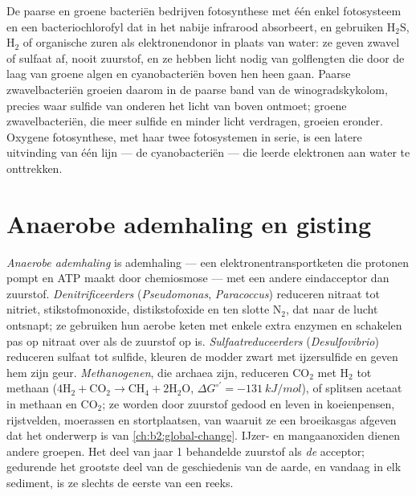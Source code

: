 \begin{definition}\label{def:b2:microbial-metabolism:anoxygenic}
De paarse en groene bacteriën bedrijven fotosynthese met één enkel
fotosysteem en een bacteriochlorofyl dat in het nabije infrarood
absorbeert, en gebruiken $\mathrm{H_2S}$, $\mathrm{H_2}$ of organische
zuren als elektronendonor in plaats van water: ze geven zwavel of
sulfaat af, nooit zuurstof, en ze hebben licht nodig van golflengten
die door de laag van groene algen en cyanobacteriën boven hen heen
gaan. Paarse zwavelbacteriën groeien daarom in de paarse band van de
winogradskykolom, precies waar sulfide van onderen het licht van boven
ontmoet; groene zwavelbacteriën, die meer sulfide en minder licht
verdragen, groeien eronder. Oxygene fotosynthese, met haar twee
fotosystemen in serie, is een latere uitvinding van één lijn --- de
cyanobacteriën --- die leerde elektronen aan water te onttrekken.
\end{definition}

\section{Anaerobe ademhaling en gisting}

\begin{definition}\label{def:b2:microbial-metabolism:anaerobic}
\emph{Anaerobe ademhaling} is ademhaling --- een
elektronentransportketen die protonen pompt en ATP maakt door
chemiosmose --- met een andere eindacceptor dan zuurstof.
\emph{Denitrificeerders} (\emph{Pseudomonas}, \emph{Paracoccus})
reduceren nitraat tot nitriet, stikstofmonoxide, distikstofoxide en ten
slotte $\mathrm{N_2}$, dat naar de lucht ontsnapt; ze gebruiken hun
aerobe keten met enkele extra enzymen en schakelen pas op nitraat over
als de zuurstof op is. \emph{Sulfaatreduceerders}
(\emph{Desulfovibrio}) reduceren sulfaat tot sulfide, kleuren de modder
zwart met ijzersulfide en geven hem zijn geur. \emph{Methanogenen}, die
archaea zijn, reduceren $\mathrm{CO_2}$ met $\mathrm{H_2}$ tot
methaan ($4\mathrm{H_2} + \mathrm{CO_2} \to \mathrm{CH_4} +
2\mathrm{H_2O}$, $\Delta G^{\circ\prime} = \qty{-131}{kJ/mol}$), of
splitsen acetaat in methaan en $\mathrm{CO_2}$; ze worden door zuurstof
gedood en leven in koeienpensen, rijstvelden, moerassen en stortplaatsen,
van waaruit ze een broeikasgas afgeven dat het onderwerp is van
\cref{ch:b2:global-change}. IJzer- en mangaanoxiden dienen andere
groepen. Het deel van jaar 1 behandelde zuurstof als \emph{de}
acceptor; gedurende het grootste deel van de geschiedenis van de aarde,
en vandaag in elk sediment, is ze slechts de eerste van een reeks.
\end{definition}

